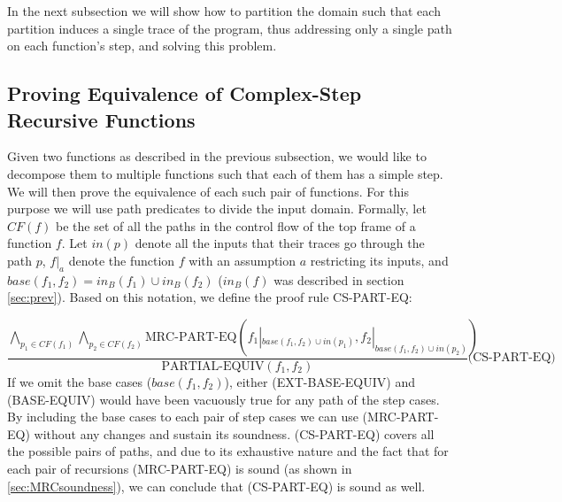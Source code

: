 In the next subsection we will show how to partition the domain such that each partition induces a single trace of the program, thus addressing only a single path on each function's step, and solving this problem. 


\subsection{Proving Equivalence of Complex-Step Recursive Functions}
Given two functions as described in the previous subsection, we would like to decompose them to multiple functions such that each of them has a simple step. We will then prove the equivalence of each such pair of functions. For this purpose we will use path predicates to divide the input domain. Formally, let $CF(f)$ be the set of all the paths in the control flow of the top frame of a function $f$. Let $in(p)$ denote all the inputs that their traces go through the path $p$, $f|_a$ denote the function $f$ with an assumption $a$ restricting its inputs, and $base(f_1,f_2)=in_B(f_1) \cup in_B(f_2)$ ($in_B(f)$ was described in section \ref{sec:prev}).
Based on this notation, we define the proof rule CS-PART-EQ:

\begin{equation}
{\frac{
  \bigwedge_{p_1\in CF(f_1)}\bigwedge_{p_2\in CF(f_2)}\text{MRC-PART-EQ}(f_1|_{base(f_1,f_2) \cup in(p_1)},f_2|_{base(f_1,f_2) \cup in(p_2)})}{\text{PARTIAL-EQUIV}(f_1,f_2)}}\text{(CS-PART-EQ)}
\end{equation}
If we omit the base cases ($base(f_1,f_2)$), either (EXT-BASE-EQUIV) and (BASE-EQUIV) would have been vacuously true for any path of the step cases. By including the base cases to each pair of step cases we can use (MRC-PART-EQ) without any changes and sustain its soundness. (CS-PART-EQ) covers all the possible pairs of paths, and due to its exhaustive nature and the fact that for each pair of recursions (MRC-PART-EQ) is sound (as shown in \ref{sec:MRCsoundness}), we can conclude that (CS-PART-EQ) is sound as well.

